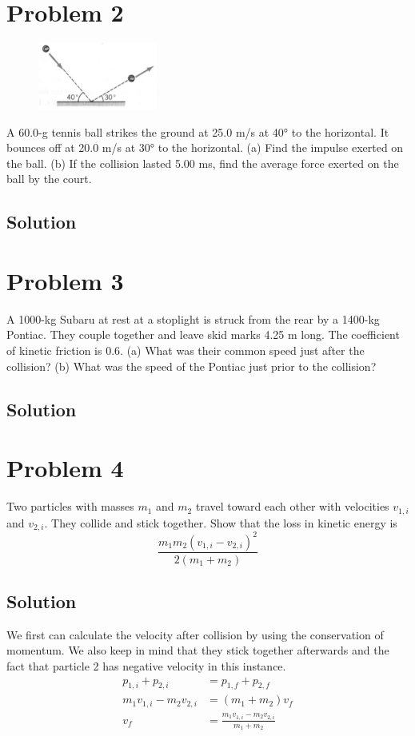 \documentclass[12pt]{article}
\begin{document}
\pagebreak
\section*{Problem 2}
\begin{figure}
    \vspace{-30pt}
    \includegraphics[width=0.35\textwidth]{graph_2.png} 
\end{figure}
A 60.0-g tennis ball strikes the ground at 25.0 m/s at 40\unit{\degree} to the horizontal. It bounces off at 20.0 m/s at 30\unit{\degree} to the horizontal. (a) Find the impulse exerted on the ball. (b) If the collision lasted 5.00 ms, find the average force exerted on the ball by the court.

\subsection*{Solution}


\pagebreak
\section*{Problem 3}
A 1000-kg Subaru at rest at a stoplight is struck from the rear by a 1400-kg Pontiac. They couple together and leave skid marks 4.25 m long. The coefficient of kinetic friction is 0.6. (a) What was their common speed just after the collision? (b) What was the speed of the Pontiac just prior to the collision?

\subsection*{Solution}


\pagebreak
\section*{Problem 4}
Two particles with masses $m_1$ and $m_2$ travel toward each other with velocities $v_{1,i}$ and $v_{2,i}$. They collide and stick together. Show that the loss in kinetic energy is
\[ \frac{m_1 m_2 \left(v_{1,i} - v_{2,i}\right)^2}{2(m_1 + m_2)} \]

\subsection*{Solution}
We first can calculate the velocity after collision by using the conservation of momentum. We also keep in mind that they stick together afterwards and the fact that particle 2 has negative velocity in this instance.
\begin{align*}
    p_{1,i} + p_{2,i} &=  p_{1,f} + p_{2,f}\\
    m_1 v_{1,i} - m_2 v_{2,i} &=  (m_1 + m_2) v_f\\
    v_f &=  \frac{m_1 v_{1,i} - m_2 v_{2,i}}{m_1 + m_2}
\end{align*}
\end{document}
